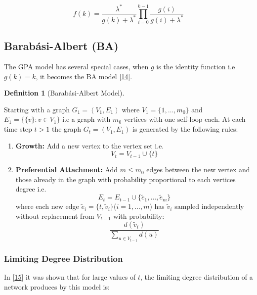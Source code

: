 \documentclass[
  10pt,
  a4paper,
]{scrreprt}
\providecommand{\tightlist}{%
  \setlength{\itemsep}{0pt}\setlength{\parskip}{0pt}}\usepackage{longtable,booktabs,array}
\theoremstyle{plain}
\theoremstyle{definition}
\newtheorem{definition}{Definition}[section]
\theoremstyle{plain}
\theoremstyle{remark}
\begin{document}
{\[
f(k) = \displaystyle\frac{\lambda^*}{g(k) + \lambda^*}\prod_{i=0}^{k-1}\displaystyle\frac{g(i)}{g(i)+\lambda^*}
\]

\hypertarget{barabuxe1si-albert-ba}{%
\subsection{Barabási-Albert (BA)}\label{barabuxe1si-albert-ba}}

The GPA model has several special cases, when \(g\) is the identity
function i.e \(g(k)=k\), it becomes the BA model
{[}\protect\hyperlink{ref-Barabasi99}{14}{]}.

\begin{definition}[Barabási-Albert
Model]\protect\hypertarget{def-ba}{}\label{def-ba}

Starting with a graph \(G_1 = (V_1, E_1)\) where
\(V_1 = \{1,\ldots,m_0\}\) and \(E_1 = \{\{v\}:v\in V_1\}\) i.e a graph
with \(m_0\) vertices with one self-loop each. At each time step \(t>1\)
the graph \(G_t = (V_1, E_1)\) is generated by the following rules:

\begin{enumerate}
\def\labelenumi{\arabic{enumi}.}
\tightlist
\item
  \textbf{Growth:} Add a new vertex to the vertex set i.e.~\[
  V_t = V_{t-1} \cup \{t\}
  \]
\item
  \textbf{Preferential Attachment:} Add \(m\le m_0\) edges between the
  new vertex and those already in the graph with probability
  proportional to each vertices degree i.e.~\[
  E_t  = E_{t-1} \cup \{\tilde e_1, \ldots, \tilde e_m\}
  \] where each new edge
  \(\tilde e_i = \{t, \tilde v_i\}\)(\(i=1,\ldots, m\)) has
  \(\tilde v_i\) sampled independently without replacement from
  \(V_{t-1}\) with probability: \[
  \frac{d(\tilde v_i)}{\sum_{u\in V_{t-1}}d(u)}
  \]
\end{enumerate}

\end{definition}

\hypertarget{limiting-degree-distribution-1}{%
\subsubsection{Limiting Degree
Distribution}\label{limiting-degree-distribution-1}}

In {[}\protect\hyperlink{ref-barabasibook}{15}{]} it was shown that for
large values of \(t\), the limiting degree distribution of a network
produces by this model is:

}
\end{document}
